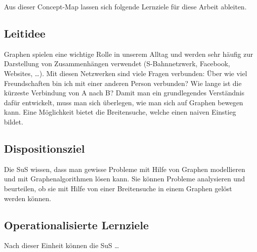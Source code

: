 Aus dieser Concept-Map lassen sich folgende Lernziele für diese Arbeit ableiten. 

\subsection{Leitidee}

Graphen spielen eine wichtige Rolle in unserem Alltag und werden sehr häufig zur Darstellung von Zusammenhängen verwendet (S-Bahnnetzwerk, Facebook, Websites, \dots). 
Mit diesen Netzwerken sind viele Fragen verbunden: Über wie viel Freundschaften bin ich mit einer anderen Person verbunden? Wie lange ist die kürzeste Verbindung von A nach B?
Damit man ein grundlegendes Verständnis dafür entwickelt, muss man sich überlegen, wie man sich auf Graphen bewegen kann. 
Eine Möglichkeit bietet die Breitensuche, welche einen naiven Einstieg bildet. 


\subsection{Dispositionsziel}

Die SuS wissen, dass man gewisse Probleme mit Hilfe von Graphen modellieren und mit Graphenalgorithmen lösen kann. 
Sie können Probleme analysieren und beurteilen, ob sie mit Hilfe von einer Breitensuche in einem Graphen gelöst werden können.



\subsection{Operationalisierte Lernziele}

Nach dieser Einheit können die SuS \dots

